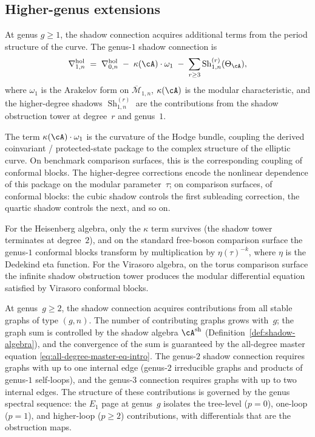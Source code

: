 \subsection{Higher-genus extensions}
\label{subsec:thqg-intro-higher-genus-blocks}

At genus $g \ge 1$, the shadow connection acquires additional terms
from the period structure of the curve. The genus-$1$ shadow
connection is
\begin{equation}\label{eq:thqg-intro-genus1-shadow}
\nabla^{\mathrm{hol}}_{1,n}
\;=\;
\nabla^{\mathrm{hol}}_{0,n}
\;-\;
\kappa(\cA) \cdot \omega_1
\;-\;
\sum_{r \ge 3}
\operatorname{Sh}_{1,n}^{(r)}(\Theta_\cA),
\end{equation}
where $\omega_1$ is the Arakelov form on $\overline{\mathcal{M}}_{1,n}$,
$\kappa(\cA)$ is the modular characteristic, and the higher-degree
shadows $\operatorname{Sh}_{1,n}^{(r)}$ are the contributions from
the shadow obstruction tower at degree~$r$ and genus~$1$.

The term $\kappa(\cA) \cdot \omega_1$ is the curvature of the Hodge
bundle, coupling the derived coinvariant / protected-state package to
the complex structure of the elliptic curve. On benchmark comparison
surfaces, this is the corresponding coupling of conformal blocks.
The higher-degree corrections encode the nonlinear
dependence of this package on the modular parameter~$\tau$; on
comparison surfaces, of conformal blocks: the
cubic shadow controls the first subleading correction, the quartic
shadow controls the next, and so on.

For the Heisenberg algebra, only the $\kappa$ term survives (the shadow
tower terminates at degree~$2$), and on the standard free-boson
comparison surface the genus-$1$ conformal blocks transform by
multiplication by $\eta(\tau)^{-k}$, where $\eta$ is the
Dedekind eta function. For the Virasoro algebra, on the torus
comparison surface the infinite shadow obstruction tower produces the modular
differential equation satisfied by Virasoro conformal blocks.

At genus~$g \ge 2$, the shadow connection acquires contributions from
all stable graphs of type $(g,n)$. The number of contributing graphs
grows with~$g$; the graph sum is controlled by the shadow algebra
$\cA^{\mathrm{sh}}$ (Definition~\ref{def:shadow-algebra}), and the
convergence of the sum is guaranteed by the all-degree master equation
\eqref{eq:all-degree-master-eq-intro}. The genus-$2$ shadow connection
requires graphs with up to one internal edge (genus-$2$ irreducible
graphs and products of genus-$1$ self-loops), and the genus-$3$
connection requires graphs with up to two internal edges. The
structure of these contributions is governed by the genus spectral
sequence: the $E_1$ page at genus~$g$ isolates the tree-level ($p = 0$),
one-loop ($p = 1$), and higher-loop ($p \ge 2$) contributions,
with differentials that are the obstruction maps.


